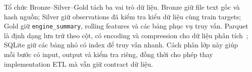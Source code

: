 Tổ chức Bronze--Silver--Gold tách ba vai trò dữ liệu. Bronze giữ file text gốc và
hash nguồn; Silver giữ observations đã kiểm tra kiểu dữ liệu cùng train targets;
Gold giữ \texttt{engine\_summary}, rolling features và các bảng phục vụ truy vấn.
Parquet là định dạng lưu trữ theo cột, có encoding và compression cho dữ liệu
phân tích~\cite{apacheParquetOverview}; SQLite giữ các bảng nhỏ có index để truy
vấn nhanh. Cách phân lớp này giúp mỗi bước có input, output và kiểm tra riêng,
đồng thời cho phép thay implementation ETL mà vẫn giữ contract dữ liệu.
